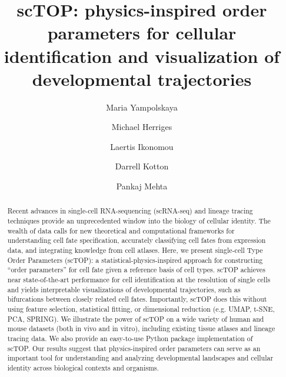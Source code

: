 \documentclass[aps,superscriptaddress, notitlepage,longbibliography]{revtex4-1}
\begin{document}
\title{ scTOP: physics-inspired order parameters for cellular identification and visualization of developmental trajectories}

\author{Maria Yampolskaya}
\author{Michael Herriges}
\author{Laertis Ikonomou}
\author{Darrell Kotton}
\author{Pankaj Mehta}


\begin{abstract}
Recent advances in single-cell RNA-sequencing (scRNA-seq) and lineage tracing techniques provide an unprecedented window into the biology of cellular identity. The wealth of data calls for new theoretical and computational frameworks for understanding cell fate specification, accurately classifying cell fates from expression data, and integrating knowledge from cell atlases. Here, we present single-cell Type Order Parameters (scTOP): a statistical-physics-inspired approach for constructing “order parameters” for cell fate given a reference basis of cell types.  scTOP achieves near state-of-the-art performance for cell identification at the resolution of single cells and yields interpretable visualizations of developmental trajectories, such as bifurcations between closely related cell fates. Importantly, scTOP does this without using feature selection, statistical fitting, or dimensional reduction (e.g. UMAP, t-SNE, PCA, SPRING). We illustrate the power of scTOP on a wide variety of human and mouse datasets (both in vivo and in vitro), including existing tissue atlases and lineage tracing data. We also provide an easy-to-use Python package implementation of scTOP. Our results suggest that physics-inspired order parameters can serve as an important tool for understanding and analyzing developmental landscapes and cellular identity across biological contexts and organisms.
\end{abstract}
\end{document}
